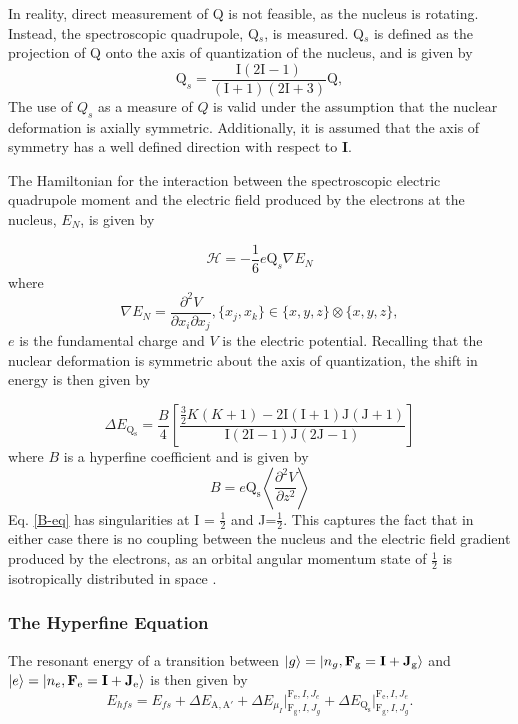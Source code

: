 In reality, direct measurement of Q is not feasible, as the nucleus is rotating. Instead, the spectroscopic quadrupole, Q$_s$, is measured. Q$_s$ is defined as the projection of Q onto the axis of quantization of the nucleus, and is given by
\begin{equation}
\mathrm{Q}_s = \frac{\mathrm{I}(2\mathrm{I}-1)}{(\mathrm{I}+1)(2\mathrm{I}+3)}\mathrm{Q},
\end{equation}
The use of $Q_s$ as a measure of $Q$ is valid under the assumption that the nuclear deformation is axially symmetric. Additionally, it is assumed that the axis of symmetry has a well defined direction with respect to \textbf{I}.

The Hamiltonian for the interaction between the spectroscopic electric quadrupole moment and the electric field produced by the electrons at the nucleus, $E_N$, is given by

\begin{equation}
\mathcal{H} = - \frac{1}{6}e\mathrm{Q}_s\nabla{E_N}
\end{equation}
where
\begin{equation}
\nabla{E_N} = \frac{\partial^2V}{\partial x_i\partial x_j}, \{x_j,x_k\} \in \{x,y,z\} \otimes \{x,y,z\},
\end{equation}
$e$ is the fundamental charge and $V$ is the electric potential. Recalling that the nuclear deformation is symmetric about the axis of quantization, the shift in energy is then given by

\begin{equation}
\Delta E_{\mathrm{Q_s}} = \frac{B}{4}\left[\frac{\frac{3}{2}K(K+1)-2\mathrm{I}(\mathrm{I}+1)\mathrm{J}(\mathrm{J}+1)}{\mathrm{I}(2\mathrm{I}-1)\mathrm{J}(2\mathrm{J}-1)}\right]
\label{B-eq}
\end{equation}
where $B$ is a hyperfine coefficient and is given by
\begin{equation}
B = e\mathrm{Q_s}\left\langle\frac{\partial^2V}{\partial z^2} \right\rangle
\end{equation}
Eq. \ref{B-eq} has singularities at I = $\frac{1}{2}$ and J=$\frac{1}{2}$. This captures the fact that in either case there is no coupling between the nucleus and the electric field gradient produced by the electrons, as an orbital angular momentum state of $\frac{1}{2}$ is isotropically distributed in space .

\subsubsection{The Hyperfine Equation}
The resonant energy of a transition between $\ket{g}=\ket{n_g,\mathrm{\textbf{F}_g=\textbf{I} + \textbf{J}_g}}$ and $\ket{e}=\ket{n_e,\mathrm{\textbf{F}_e=\textbf{I} + \textbf{J}_e}}$ is then given by
\begin{equation}
E_{hfs} = E_{fs} +  \Delta E_{\mathrm{A,A'}}+\Delta E_{\mu_I}\Bigr|_{\mathrm{F_g},I,J_g}^{\mathrm{F_e},I,J_e}+\Delta E_{\mathrm{Q_s}}\Bigr|_{\mathrm{F_g},I,J_g}^{\mathrm{F_e},I,J_e}.
\end{equation}

